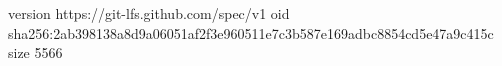 version https://git-lfs.github.com/spec/v1
oid sha256:2ab398138a8d9a06051af2f3e960511e7c3b587e169adbc8854cd5e47a9c415c
size 5566
